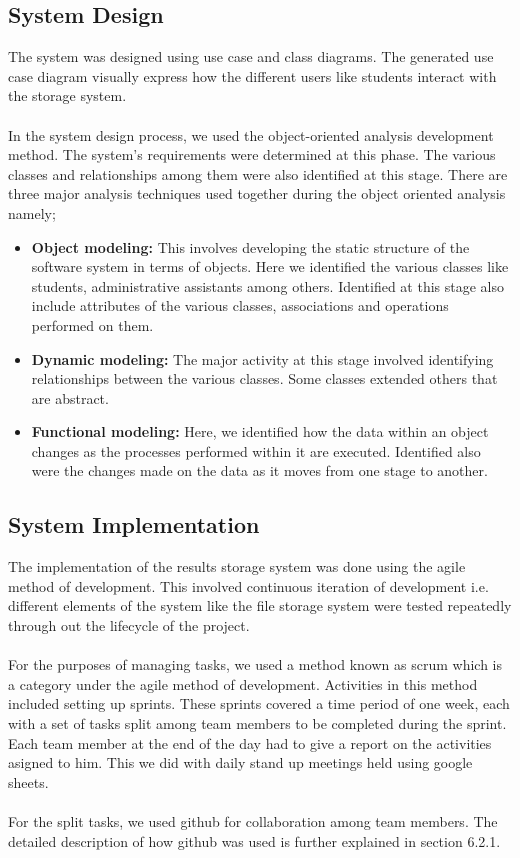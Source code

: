 \subsection{System Design}
The system was designed using use case and class diagrams. The generated use case diagram visually express how the different users like students interact with the storage system. \\~\\
In the system design process, we used the object-oriented analysis development method. The system’s requirements were determined at this phase. The various classes and relationships among them were also identified at this stage. There are three major analysis techniques used together during the object oriented analysis namely;
\begin{itemize}
\item \textbf{Object modeling:} This involves developing the static structure of the software system in terms of objects. Here we identified the various classes like students, administrative assistants among others. Identified at this stage also include attributes of the various classes, associations and operations performed on them.
\item \textbf{Dynamic modeling:} The major activity at this stage involved identifying relationships between the various classes. Some classes extended others that are abstract.  
\item \textbf{Functional modeling:} Here, we identified how the data within an object changes as the processes performed within it are executed. Identified also were the changes made on the data as it moves from one stage to another.
\end{itemize}

\subsection{System Implementation}
The implementation of the results storage system was done using the agile method of development. This involved continuous iteration  of development i.e. different elements of the system like the file storage system were tested repeatedly through out the lifecycle of the project.\\~\\
For the purposes of managing tasks, we used a method known as scrum which is a category under the agile method of development. Activities in this method included setting up sprints. These sprints covered a time period of one week, each with a set of tasks split among team members to be completed during the sprint. Each team member at the end of the day had to give a report on the activities asigned to him. This we did with daily stand up meetings held using google sheets\cite{art12}.\\~\\
For the split tasks, we used github for collaboration among team members. The detailed description of how github was used is further explained in section 6.2.1.


